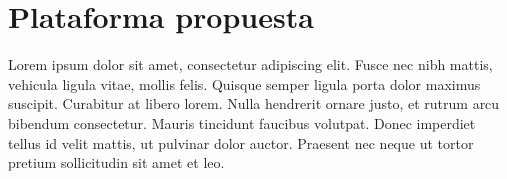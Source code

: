 \section{Plataforma propuesta}

Lorem ipsum dolor sit amet, consectetur adipiscing elit. Fusce nec nibh mattis, vehicula ligula vitae, mollis felis. Quisque semper ligula porta dolor maximus suscipit. Curabitur at libero lorem. Nulla hendrerit ornare justo, et rutrum arcu bibendum consectetur. Mauris tincidunt faucibus volutpat. Donec imperdiet tellus id velit mattis, ut pulvinar dolor auctor. Praesent nec neque ut tortor pretium sollicitudin sit amet et leo.

